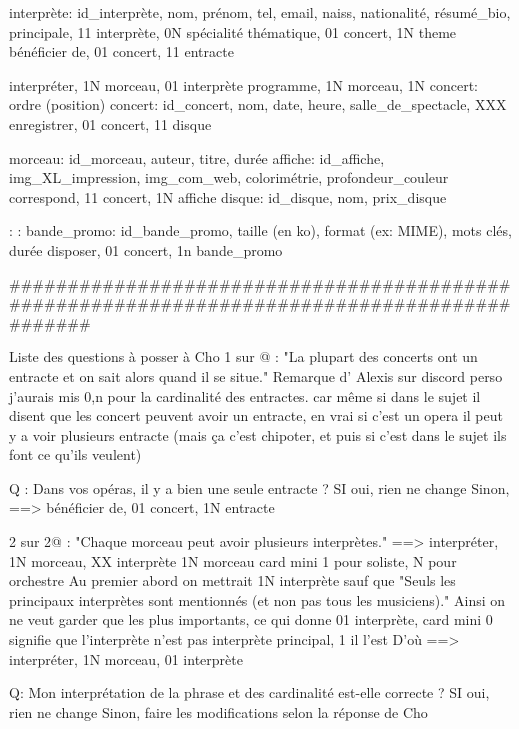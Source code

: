 \documentclass[12pt,a4paper]{article}
\begin{document}
{interprète: id_interprète, nom, prénom, tel, email, naiss, nationalité, résumé_bio,
principale, 11 interprète, 0N spécialité
thématique, 01 concert, 1N theme
bénéficier de, 01 concert, 11 entracte

interpréter, 1N morceau, 01 interprète
programme, 1N morceau, 1N concert: ordre (position)
concert: id_concert, nom, date, heure, salle_de_spectacle, XXX
enregistrer, 01 concert, 11 disque

morceau: id_morceau, auteur, titre, durée
affiche: id_affiche, img_XL_impression, img_com_web, colorimétrie, profondeur_couleur
correspond, 11 concert, 1N affiche
disque: id_disque, nom, prix_disque

:
:
bande_promo: id_bande_promo, taille (en ko), format (ex: MIME), mots clés, durée 
disposer, 01 concert, 1n bande_promo

#############################################################################################







Liste des questions à posser à Cho
1 sur @ : "La plupart des concerts ont un entracte et on sait alors quand il se situe."
Remarque d' Alexis sur discord
perso j'aurais mis 0,n pour la cardinalité des entractes. car même si dans le sujet il disent que les concert peuvent avoir un entracte, en vrai si c'est un opera il peut y a voir plusieurs entracte (mais ça c'est chipoter, et puis si c'est dans le sujet ils font ce qu'ils veulent)

Q : Dans vos opéras, il y a bien une seule entracte ?
SI oui, rien ne change
Sinon, ==>  bénéficier de, 01 concert, 1N entracte



2 sur 2@ : "Chaque morceau peut avoir plusieurs interprètes."
==> interpréter, 1N morceau, XX interprète
1N morceau card mini 1 pour soliste, N pour orchestre
Au premier abord on mettrait 1N interprète sauf que
"Seuls les principaux interprètes sont mentionnés (et non pas tous les musiciens)."
Ainsi on ne veut garder que les plus importants, ce qui donne
01 interprète, card mini 0 signifie que l'interprète n'est pas interprète principal, 1 il l'est
D'où ==> interpréter, 1N morceau, 01 interprète

Q: Mon interprétation de la phrase et des cardinalité est-elle correcte ?
SI oui, rien ne change
Sinon, faire les modifications selon la réponse de Cho



}
\end{document}
